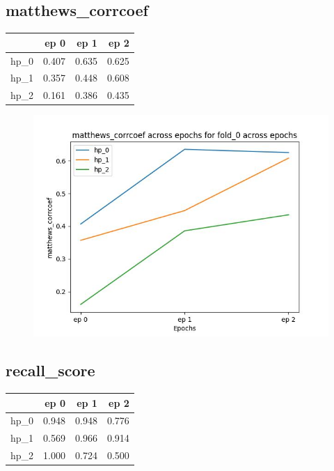 \documentclass{article}
\begin{document}
\subsection{matthews\_corrcoef}
\begin{tabular}{lrrr}
\toprule
{} &   ep 0 &   ep 1 &   ep 2 \\
\midrule
hp\_0 &  0.407 &  0.635 &  0.625 \\
hp\_1 &  0.357 &  0.448 &  0.608 \\
hp\_2 &  0.161 &  0.386 &  0.435 \\
\bottomrule
\end{tabular}

\begin{figure}[H]
\includegraphics[scale = 0.75]{fold_0/matthews_corrcoef}
\end{figure}
\subsection{recall\_score}
\begin{tabular}{lrrr}
\toprule
{} &   ep 0 &   ep 1 &   ep 2 \\
\midrule
hp\_0 &  0.948 &  0.948 &  0.776 \\
hp\_1 &  0.569 &  0.966 &  0.914 \\
hp\_2 &  1.000 &  0.724 &  0.500 \\
\bottomrule
\end{tabular}
\end{document}
